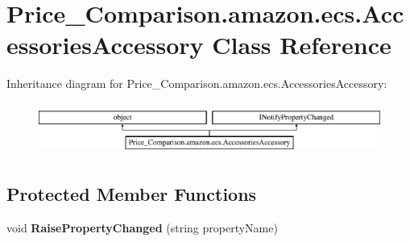 \hypertarget{class_price___comparison_1_1amazon_1_1ecs_1_1_accessories_accessory}{\section{Price\-\_\-\-Comparison.\-amazon.\-ecs.\-Accessories\-Accessory Class Reference}
\label{class_price___comparison_1_1amazon_1_1ecs_1_1_accessories_accessory}
}


 


Inheritance diagram for Price\-\_\-\-Comparison.\-amazon.\-ecs.\-Accessories\-Accessory\-:\begin{figure}[H]
\begin{center}
\leavevmode
\includegraphics[height=1.696970cm]{class_price___comparison_1_1amazon_1_1ecs_1_1_accessories_accessory}
\end{center}
\end{figure}
\subsection*{Protected Member Functions}
\begin{DoxyCompactItemize}
\item 
\hypertarget{class_price___comparison_1_1amazon_1_1ecs_1_1_accessories_accessory_aaa9763e4640a285ed5905ce16e045844}{void {\bfseries Raise\-Property\-Changed} (string property\-Name)}\label{class_price___comparison_1_1amazon_1_1ecs_1_1_accessories_accessory_aaa9763e4640a285ed5905ce16e045844}

\end{DoxyCompactItemize}
